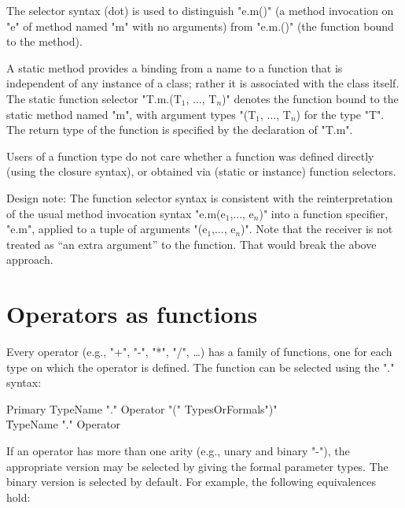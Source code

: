 \begin{note}
The selector syntax (dot) is used to distinguish \xcd"e.m()" (a
method invocation on \xcd"e" of method named \xcd"m" with no arguments)
from \xcd"e.m.()"
(the function bound to the method). 
\end{note}

A static method provides a binding from a name to a function that is
independent of any instance of a class; rather it is associated with the
class itself. The static function selector
\xcdmath"T.m.(T$_1$, $\dots$, T$_n$)" denotes the
function bound to the static method named \xcd"m", with argument types
\xcdmath"(T$_1$, $\dots$, T$_n$) for the type \xcd"T". The return type
of the function is specified by the declaration of \xcd"T.m".

Users of a function type do not care whether a function was defined
directly (using the closure syntax), or obtained via (static or
instance) function selectors.

\begin{note}
Design note: The function selector syntax is consistent with the
reinterpretation of the usual method invocation syntax
\xcdmath"e.m(e$_1$,..., e$_n$)"
into a function specifier, \xcd"e.m", applied to a tuple of arguments
\xcdmath"(e$_1$,..., e$_n$)". Note that the receiver is not
treated as ``an extra argument'' to the
function. That would break the above approach.
\end{note}


\section{Operators as functions}

Every operator (e.g.,
\xcd"+",
\xcd"-",
\xcd"*",
\xcd"/",
\dots) has a family of functions, one for
each type on which the operator is defined. The function can be
selected using the "." syntax:

\begin{grammar}
Primary \: TypeName \xcd"." Operator \xcd"(" TypesOrFormals\opt \xcd")" \\
        \| TypeName \xcd"." Operator \\
\end{grammar}

If an operator has more than one arity (e.g., unary and binary
\xcd"-"), the appropriate version may be selected by giving the
formal parameter types.  The binary version is selected by
default.
For example, the following equivalences hold:

